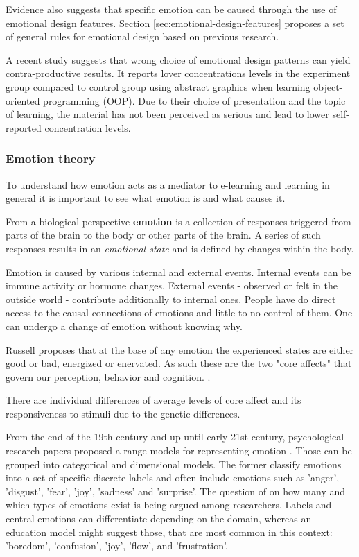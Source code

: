 	Evidence also suggests that specific emotion can be caused through the use of emotional design features. Section \ref{sec:emotional-design-features} proposes a set of general rules for emotional design based on previous research.
	
	A recent study \cite{Haaranen2015} suggests that wrong choice of emotional design patterns can yield contra-productive results. It reports lover concentrations levels in the experiment group compared to control group using abstract graphics when learning object-oriented programming (OOP). Due to their choice of presentation and the topic of learning, the material has not been perceived as serious and lead to lower self-reported concentration levels.
		
		\subsubsection{Emotion theory} \label{sec:emotion-theory}
		
		To understand how emotion acts as a mediator to e-learning and learning in general it is important to see what emotion is and what causes it.
		
		From a biological perspective \textbf{emotion} is a collection of responses triggered from parts of the brain to the body or other parts of the brain. A series of such responses results in an \textit{emotional state} and is defined by changes within the body. \cite{Damasio1998}
	
		Emotion is caused by various internal and external events. Internal events can be immune activity or hormone changes. External events - observed or felt in the outside world - contribute additionally to internal ones. People have do direct access to the causal connections of emotions and little to no control of them. One can undergo a change of emotion without knowing why. \cite{Russell2003}
		
		Russell proposes that at the base of any emotion the experienced states are either good or bad, energized or enervated. As such these are the two "core affects" that govern our perception, behavior and cognition. \cite{Russell2003}. 
		
		There are individual differences of average levels of core affect and its responsiveness to stimuli due to the genetic differences. \cite{Russell2003}
		
		From the end of the 19th century and up until early 21st century, psychological research papers proposed a range models for representing emotion . Those can be grouped into categorical and dimensional models. The former classify emotions into a set of specific discrete labels and often include emotions such as 'anger', 'disgust', 'fear', 'joy', 'sadness' and 'surprise'. The question of on how many and which types of emotions exist is being argued among researchers. 
		Labels and central emotions can differentiate depending on the domain, whereas an education model might suggest those, that are most common in this context: 'boredom', 'confusion', 'joy', 'flow', and 'frustration'.
		
